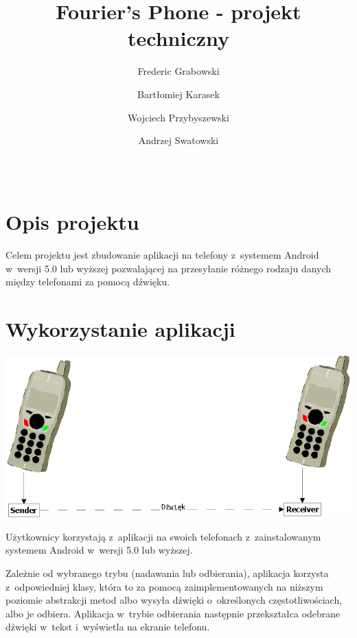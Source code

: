 \documentclass{article}
\title{Fourier's Phone - projekt techniczny}
\author{Frederic Grabowski \and Bartłomiej Karasek \and Wojciech Przybyszewski 
        \and Andrzej Swatowski}
\date{\documentdate \\ \documentversion}
\begin{document}
\maketitle
\newpage

\tableofcontents
\newpage

\section{Opis projektu}
Celem projektu jest zbudowanie aplikacji na telefony z~systemem Android w~wersji
5.0 lub wyższej pozwalającej na przesyłanie różnego rodzaju danych między 
telefonami za pomocą dźwięku.

\section{Wykorzystanie aplikacji}
\vspace{5mm}
\includegraphics[width=\textwidth]{send_receive_uml.png}
\par
Użytkownicy korzystają z~aplikacji na swoich telefonach z~zainstalowanym
systemem Android w~wersji 5.0 lub wyższej. \par
Zależnie od wybranego trybu (nadawania lub odbierania), aplikacja korzysta
z~odpowiedniej klasy, która to za pomocą zaimplementowanych na niższym poziomie
abstrakcji metod albo wysyła dźwięki o~określonych częstotliwościach, albo je
odbiera. Aplikacja w~trybie odbierania następnie przekształca odebrane dźwięki
w~tekst i~wyświetla na ekranie telefonu.
\end{document}
